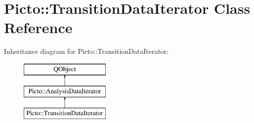 \hypertarget{class_picto_1_1_transition_data_iterator}{\section{Picto\-:\-:Transition\-Data\-Iterator Class Reference}
\label{class_picto_1_1_transition_data_iterator}
}
Inheritance diagram for Picto\-:\-:Transition\-Data\-Iterator\-:\begin{figure}[H]
\begin{center}
\leavevmode
\includegraphics[height=3.000000cm]{class_picto_1_1_transition_data_iterator}
\end{center}
\end{figure}
